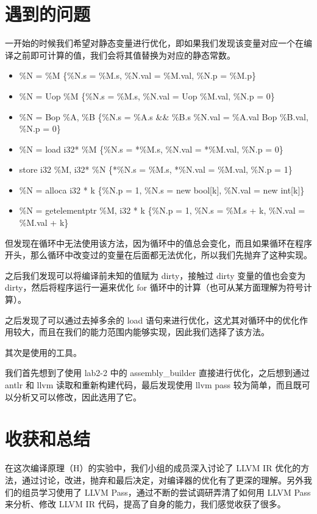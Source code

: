 \documentclass{ctexart}
\begin{document}
    \section{遇到的问题}
    一开始的时候我们希望对静态变量进行优化，即如果我们发现该变量对应一个在编译之前即可计算的值，我们会将其值替换为对应的静态常数。
    \begin{itemize}
        \item \%N = \%M \{\%N.s = \%M.s, \%N.val = \%M.val, \%N.p = \%M.p\}
        \item \%N = Uop \%M \{\%N.s = \%M.s, \%N.val = Uop \%M.val, \%N.p = 0\}
        \item \%N = Bop \%A, \%B \{\%N.s = \%A.s \&\& \%B.s \%N.val = \%A.val Bop \%B.val, \%N.p = 0\}
        \item \%N = load i32* \%M \{\%N.s = *\%M.s, \%N.val = *\%M.val, \%N.p = 0\}
        \item store i32 \%M, i32* \%N \{*\%N.s = \%M.s, *\%N.val = \%M.val, \%N.p = 1\}
        \item \%N = alloca i32 * k \{\%N.p = 1, \%N.s = new bool[k], \%N.val = new int[k]\}
        \item \%N = getelementptr \%M, i32 * k \{\%N.p = 1, \%N.s = \%M.s + k, \%N.val = \%M.val + k\}
    \end{itemize}
    但发现在循环中无法使用该方法，因为循环中的值总会变化，而且如果循环在程序开头，那么循环中改变过的变量在后面都无法优化，所以我们先抛弃了这种实现。
    
    之后我们发现可以将编译前未知的值赋为 dirty，接触过 dirty 变量的值也会变为 dirty，然后将程序运行一遍来优化 for 循环中的计算（也可从某方面理解为符号计算）。

    之后发现了可以通过去掉多余的 load 语句来进行优化，这尤其对循环中的优化作用较大，而且在我们的能力范围内能够实现，因此我们选择了该方法。

    其次是使用的工具。

    我们首先想到了使用 lab2-2 中的 assembly\_builder 直接进行优化，之后想到通过 antlr 和 llvm 读取和重新构建代码，最后发现使用 llvm pass 较为简单，而且既可以分析又可以修改，因此选用了它。
    \section{收获和总结}
    在这次编译原理（H）的实验中，我们小组的成员深入讨论了 LLVM IR 优化的方法，通过讨论，改进，抛弃和最后决定，对编译器的优化有了更深的理解。另外我们的组员学习使用了 LLVM Pass，通过不断的尝试调研弄清了如何用 LLVM Pass 来分析、修改 LLVM IR 代码，提高了自身的能力，我们感觉收获了很多。
\end{document}
